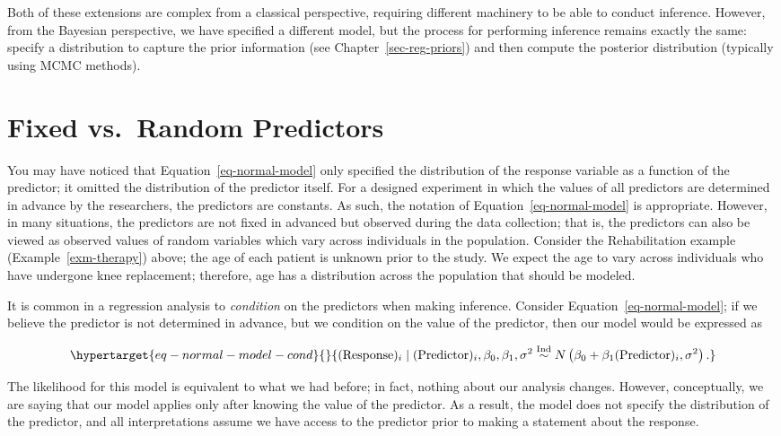 \documentclass[
  letterpaper,
  DIV=11,
  numbers=noendperiod]{scrreprt}
\theoremstyle{definition}
\theoremstyle{definition}
\theoremstyle{plain}
\theoremstyle{remark}
\begin{document}
Both of these extensions are complex from a classical perspective,
requiring different machinery to be able to conduct inference. However,
from the Bayesian perspective, we have specified a different model, but
the process for performing inference remains exactly the same: specify a
distribution to capture the prior information (see
Chapter~\ref{sec-reg-priors}) and then compute the posterior
distribution (typically using MCMC methods).

\hypertarget{fixed-vs.-random-predictors}{%
\section{Fixed vs.~Random
Predictors}\label{fixed-vs.-random-predictors}}

You may have noticed that Equation~\ref{eq-normal-model} only specified
the distribution of the response variable as a function of the
predictor; it omitted the distribution of the predictor itself. For a
designed experiment in which the values of all predictors are determined
in advance by the researchers, the predictors are constants. As such,
the notation of Equation~\ref{eq-normal-model} is appropriate. However,
in many situations, the predictors are not fixed in advanced but
observed during the data collection; that is, the predictors can also be
viewed as observed values of random variables which vary across
individuals in the population. Consider the Rehabilitation example
(Example~\ref{exm-therapy}) above; the age of each patient is unknown
prior to the study. We expect the age to vary across individuals who
have undergone knee replacement; therefore, age has a distribution
across the population that should be modeled.

It is common in a regression analysis to \emph{condition} on the
predictors when making inference. Consider
Equation~\ref{eq-normal-model}; if we believe the predictor is not
determined in advance, but we condition on the value of the predictor,
then our model would be expressed as

\begin{equation}\protect\hypertarget{eq-normal-model-cond}{}{(\text{Response})_i \mid (\text{Predictor})_i, \beta_0, \beta_1, \sigma^2 \stackrel{\text{Ind}}{\sim}N\left(\beta_0 + \beta_1 (\text{Predictor})_i, \sigma^2\right).}\label{eq-normal-model-cond}\end{equation}

The likelihood for this model is equivalent to what we had before; in
fact, nothing about our analysis changes. However, conceptually, we are
saying that our model applies only after knowing the value of the
predictor. As a result, the model does not specify the distribution of
the predictor, and all interpretations assume we have access to the
predictor prior to making a statement about the response.
\end{document}
